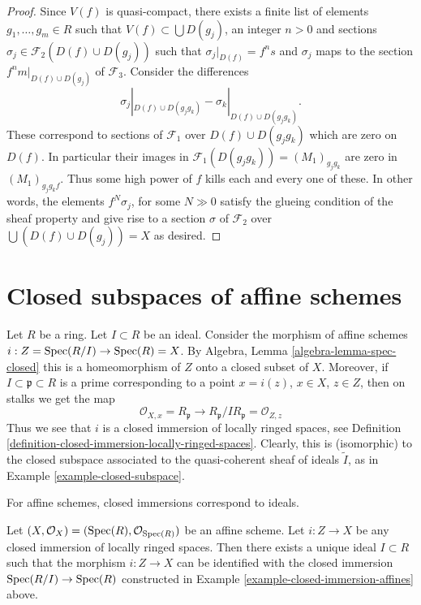 \begin{proof}
\medskip\noindent
Since $V(f)$ is quasi-compact, there exists a finite list
of elements $g_1, \ldots, g_m \in R$ such that
$V(f) \subset \bigcup D(g_j)$, an integer $n > 0$ and sections
$\sigma_j \in \mathcal{F}_2(D(f) \cup D(g_j))$ such that
$\sigma_j|_{D(f)} = f^n s$ and $\sigma_j$ maps to the section
$f^nm|_{D(f) \cup D(g_j)}$ of $\mathcal{F}_3$.
Consider the differences
$$
\sigma_j|_{D(f) \cup D(g_jg_k)}
-
\sigma_k|_{D(f) \cup D(g_jg_k)}.
$$
These correspond to sections of $\mathcal{F}_1$
over $D(f) \cup D(g_jg_k)$ which are zero
on $D(f)$. In particular their images in
$\mathcal{F}_1(D(g_jg_k)) = (M_1)_{g_jg_k}$
are zero in $(M_1)_{g_jg_kf}$.
Thus some high power of $f$ kills each and every one of these.
In other words, the elements $f^N \sigma_j$, for some $N \gg 0$
satisfy the glueing condition of the sheaf property and
give rise to a section $\sigma $ of $\mathcal{F}_2$
over $\bigcup (D(f) \cup D(g_j)) = X$ as desired.
\end{proof}







\section{Closed subspaces of affine schemes}
\label{section-closed-in-affine}

\begin{example}
\label{example-closed-immersion-affines}
Let $R$ be a ring.
Let $I \subset R$ be an ideal.
Consider the morphism of affine schemes
$i : Z = \mathop{\mathrm{Spec}}(R/I) \to \mathop{\mathrm{Spec}}(R) = X$.
By Algebra, Lemma \ref{algebra-lemma-spec-closed}
this is a homeomorphism of $Z$ onto a closed
subset of $X$. Moreover, if $I \subset \mathfrak p \subset R$
is a prime corresponding to a point $x = i(z)$, $x \in X$,
$z \in Z$, then on stalks we get the map
$$
\mathcal{O}_{X, x} = R_{\mathfrak p}
\longrightarrow
R_{\mathfrak p}/IR_{\mathfrak p} = \mathcal{O}_{Z, z}
$$
Thus we see that $i$ is a closed immersion of locally ringed spaces,
see Definition \ref{definition-closed-immersion-locally-ringed-spaces}.
Clearly, this is (isomorphic) to the closed subspace associated
to the quasi-coherent sheaf of ideals $\widetilde I$, as in
Example \ref{example-closed-subspace}.
\end{example}

\begin{lemma}
\label{lemma-closed-immersion-affine-case}
\begin{slogan}
For affine schemes, closed immersions correspond to ideals.
\end{slogan}
Let $(X, \mathcal{O}_X) = (\mathop{\mathrm{Spec}}(R), \mathcal{O}_{\mathop{\mathrm{Spec}}(R)})$
be an affine scheme. Let $i : Z \to X$ be any closed immersion
of locally ringed spaces. Then there exists a unique ideal
$I \subset R$ such that the morphism $i : Z \to X$ can be identified
with the closed immersion $\mathop{\mathrm{Spec}}(R/I) \to \mathop{\mathrm{Spec}}(R)$
constructed in Example \ref{example-closed-immersion-affines} above.
\end{lemma}

